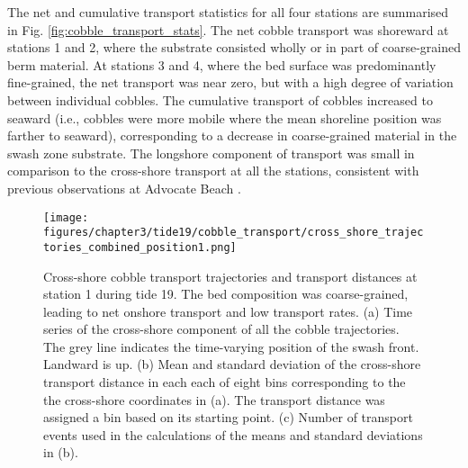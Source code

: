 The net and cumulative transport statistics for all four stations are summarised in Fig. \ref{fig:cobble_transport_stats}. The net cobble transport was shoreward at stations 1 and 2, where the substrate consisted wholly or in part of coarse-grained berm material. At stations 3 and 4, where the bed surface was predominantly fine-grained, the net transport was near zero, but with a high degree of variation between individual cobbles. The cumulative transport of cobbles increased to seaward (i.e., cobbles were more mobile where the mean shoreline position was farther to seaward), corresponding to a decrease in coarse-grained material in the swash zone substrate. The longshore component of transport was small in comparison to the cross-shore transport at all the stations, consistent with previous observations at Advocate Beach \citep[e.g.,][]{Stark_Hay2016}. 

\begin{figure}[tbp] %
	\texttt{[image: figures/chapter3/tide19/cobble\_transport/cross\_shore\_trajectories\_combined\_position1.png]}
	\caption[Cross-shore cobble transport trajectories and distances: Station 1]{Cross-shore cobble transport trajectories and transport distances at station 1 during tide 19. The bed composition was coarse-grained, leading to net onshore transport and low transport rates. (a) Time series of the cross-shore component of all the cobble trajectories. The grey line indicates the time-varying position of the swash front. Landward  is up. (b) Mean and standard deviation of the cross-shore transport distance in each each of eight bins corresponding to the the cross-shore coordinates in (a). The transport distance was assigned a bin based on its starting point. (c) Number of transport events used in the calculations of the means and standard deviations in (b).}
	\label{fig:cobble_transport_station1}
\end{figure}

